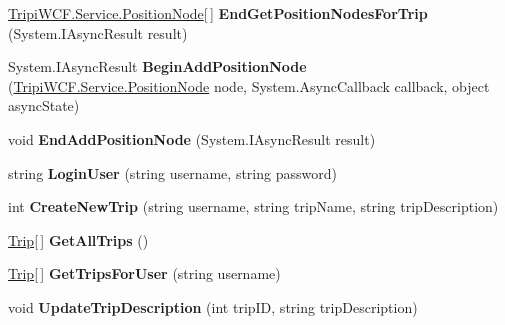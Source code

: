 \begin{DoxyCompactItemize}
\item 
\hypertarget{interface_i_trip_service_a6f522a89afc016164069f8c983d6b637}{
\hyperlink{class_tripi_w_c_f_1_1_service_1_1_position_node}{TripiWCF.Service.PositionNode}\mbox{[}$\,$\mbox{]} {\bfseries EndGetPositionNodesForTrip} (System.IAsyncResult result)}
\label{interface_i_trip_service_a6f522a89afc016164069f8c983d6b637}

\item 
\hypertarget{interface_i_trip_service_a740f261ae2d3cdb5d57473f05d7403da}{
System.IAsyncResult {\bfseries BeginAddPositionNode} (\hyperlink{class_tripi_w_c_f_1_1_service_1_1_position_node}{TripiWCF.Service.PositionNode} node, System.AsyncCallback callback, object asyncState)}
\label{interface_i_trip_service_a740f261ae2d3cdb5d57473f05d7403da}

\item 
\hypertarget{interface_i_trip_service_ac8238f88b8fd49bb1b9fb44dc1029c75}{
void {\bfseries EndAddPositionNode} (System.IAsyncResult result)}
\label{interface_i_trip_service_ac8238f88b8fd49bb1b9fb44dc1029c75}

\item 
\hypertarget{interface_i_trip_service_ae7dad8ff13217bc8d97f43db7375c4c2}{
string {\bfseries LoginUser} (string username, string password)}
\label{interface_i_trip_service_ae7dad8ff13217bc8d97f43db7375c4c2}

\item 
\hypertarget{interface_i_trip_service_a6100ef3e23a8398c61e56ab12019bf29}{
int {\bfseries CreateNewTrip} (string username, string tripName, string tripDescription)}
\label{interface_i_trip_service_a6100ef3e23a8398c61e56ab12019bf29}

\item 
\hypertarget{interface_i_trip_service_ac6c4304690c75b8403afc111748cb6c4}{
\hyperlink{class_trip}{Trip}\mbox{[}$\,$\mbox{]} {\bfseries GetAllTrips} ()}
\label{interface_i_trip_service_ac6c4304690c75b8403afc111748cb6c4}

\item 
\hypertarget{interface_i_trip_service_a395882f03013b68ff9c855b6e78cb791}{
\hyperlink{class_trip}{Trip}\mbox{[}$\,$\mbox{]} {\bfseries GetTripsForUser} (string username)}
\label{interface_i_trip_service_a395882f03013b68ff9c855b6e78cb791}

\item 
\hypertarget{interface_i_trip_service_a06b0e6ffa6675f1d7767fa6ac3399eda}{
void {\bfseries UpdateTripDescription} (int tripID, string tripDescription)}
\label{interface_i_trip_service_a06b0e6ffa6675f1d7767fa6ac3399eda}


\end{DoxyCompactItemize}
